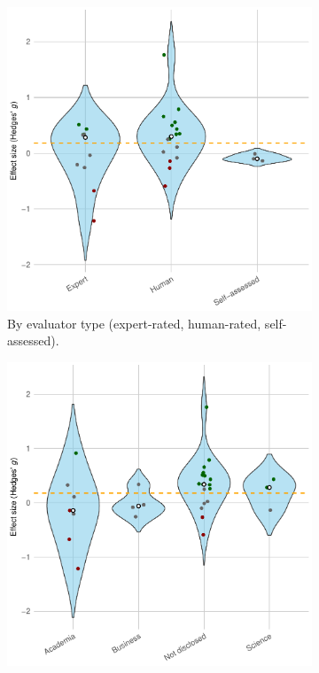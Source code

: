 \documentclass[manuscript, screen, review, acmsmall, anonymous]{acmart}
\begin{document}
\begin{figure}[H]
  \centering
  \begin{subfigure}[t]{0.49\linewidth}
    \centering
    \includegraphics[width=\linewidth]{plot_performance_raw_violin_Measurement_Evaluator}
    \caption{By evaluator type (expert-rated, human-rated, self-assessed).}
    \label{fig:performance_raw_violin_evaluator}
  \end{subfigure}%
  \hfill
  \begin{subfigure}[t]{0.49\linewidth}
    \centering
    \includegraphics[width=\linewidth]{plot_performance_raw_violin_participants}

\end{subfigure}
\end{figure}
\end{document}
